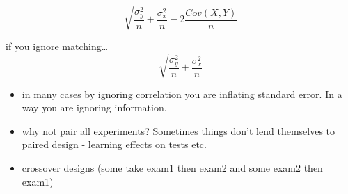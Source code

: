 \documentclass[11pt]{article}
\begin{document}
\begin{itemize}
$$
\sqrt{\frac{\sigma_y^2}{n} + \frac{\sigma_x^2}{n} - 2 \frac{Cov(X, Y)}{n}}
$$

if you ignore matching\ldots{}
$$
\sqrt{\frac{\sigma_y^2}{n} + \frac{\sigma_x^2}{n}}
$$

\begin{itemize}
\item in many cases by ignoring correlation you are inflating standard
  error. In a way you are ignoring information.
\item why not pair all experiments? Sometimes things don't lend
  themselves to paired design - learning effects on tests etc.
\item crossover designs (some take exam1 then exam2 and some exam2 then
  exam1)
\end{itemize}
 
\end{itemize} %
\end{document}
